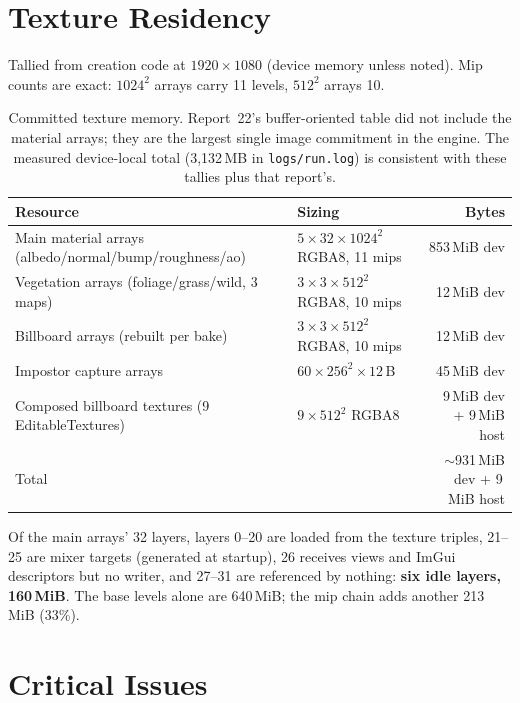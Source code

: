 \documentclass[11pt,a4paper]{article}
\begin{document}
\section{Texture Residency}
\label{sec:vram}

Tallied from creation code at $1920\times1080$ (device memory unless noted).
Mip counts are exact: $1024^2$ arrays carry 11 levels, $512^2$ arrays 10.

\begin{table}[h]
\centering
\small
\begin{tabular}{@{}p{5.9cm}p{4.3cm}r@{}}
\toprule
\textbf{Resource} & \textbf{Sizing} & \textbf{Bytes} \\
\midrule
Main material arrays (albedo/normal/bump/roughness/ao) & $5 \times 32 \times 1024^2$ RGBA8, 11 mips & 853\,MiB dev \\
Vegetation arrays (foliage/grass/wild, 3 maps) & $3 \times 3 \times 512^2$ RGBA8, 10 mips & 12\,MiB dev \\
Billboard arrays (rebuilt per bake) & $3 \times 3 \times 512^2$ RGBA8, 10 mips & 12\,MiB dev \\
Impostor capture arrays & $60 \times 256^2 \times 12$\,B & 45\,MiB dev \\
Composed billboard textures (9 EditableTextures) & $9 \times 512^2$ RGBA8 & 9\,MiB dev + 9\,MiB host \\
\midrule
Total & & $\sim$931\,MiB dev + 9\,MiB host \\
\bottomrule
\end{tabular}
\caption{Committed texture memory. Report~22's buffer-oriented table did not
include the material arrays; they are the largest single image commitment in
the engine. The measured device-local total (3{,}132\,MB in
\texttt{logs/run.log}) is consistent with these tallies plus that report's.}
\end{table}

Of the main arrays' 32 layers, layers 0--20 are loaded from the texture triples,
21--25 are mixer targets (generated at startup), 26 receives views and ImGui
descriptors but no writer, and 27--31 are referenced by nothing: \textbf{six
idle layers, 160\,MiB}. The base levels alone are 640\,MiB; the mip chain adds
another 213\,MiB (33\%).

\section{Critical Issues}
\end{document}
